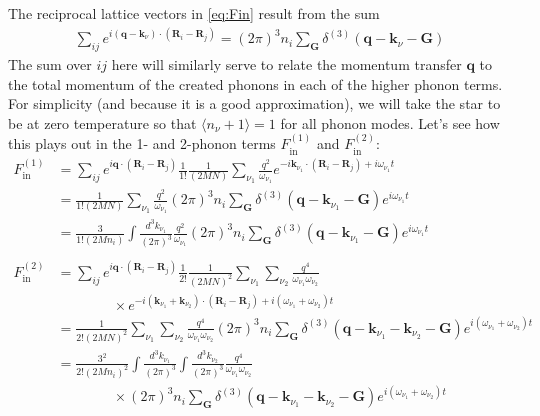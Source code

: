 \documentclass{article}
\begin{document}
The reciprocal lattice vectors in \eqref{eq:Fin} result from the sum
\begin{align}
\sum_{ij} e^{i(\textbf{q} - \textbf{k}_\nu)\cdot(\textbf{R}_i - \textbf{R}_j)} = (2 \pi)^3 n_i\sum_\textbf{G} \delta^{(3)} (\textbf{q} - \textbf{k}_\nu - \textbf{G})
\end{align}
The sum over $ij$ here will similarly serve to relate the momentum transfer $\textbf{q}$ to the total momentum of the created phonons in each of the higher phonon terms. For simplicity (and because it is a good approximation), we will take the star to be at zero temperature so that $\langle n_\nu + 1 \rangle = 1$ for all phonon modes. Let's see how this plays out in the 1- and 2-phonon terms $F_\text{in}^{(1)}$ and $F_\text{in}^{(2)}$:
\begin{align}
F_\text{in}^{(1)} &= \sum_{ij} e^{i\textbf{q}\cdot(\textbf{R}_i - \textbf{R}_j)} \frac{1}{1!} \frac{1}{(2 MN)} \sum_{\nu_1} \frac{q^2}{\omega_{\nu_1}} e^{-i \textbf{k}_{\nu_1} \cdot(\textbf{R}_i - \textbf{R}_j) + i \omega_{\nu_1} t} \nonumber\\
    &= \frac{1}{1!(2 MN)} \sum_{\nu_1} \frac{q^2}{\omega_{\nu_1}} (2 \pi)^3 n_i \sum_\textbf{G} \delta^{(3)}(\textbf{q} - \textbf{k}_{\nu_1} - \textbf{G}) e^{i \omega_{\nu_1} t} \nonumber\\
    &= \frac{3}{1!(2 M n_i)} \int\frac{d^3 k_{\nu_1}}{(2 \pi)^3} \frac{q^2}{\omega_{\nu_1}} (2 \pi)^3 n_i \sum_\textbf{G} \delta^{(3)}(\textbf{q} - \textbf{k}_{\nu_1} - \textbf{G}) e^{i \omega_{\nu_1} t} \\
  \nonumber\\
F_\text{in}^{(2)} &= \sum_{ij} e^{i\textbf{q}\cdot(\textbf{R}_i - \textbf{R}_j)} \frac{1}{2!} \frac{1}{(2 MN)^2} \sum_{\nu_1} \sum_{\nu_2} \frac{q^4}{\omega_{\nu_1}\omega_{\nu_2}} \nonumber\\
&\qquad\qquad \times e^{-i (\textbf{k}_{\nu_1} + \textbf{k}_{\nu_2}) \cdot(\textbf{R}_i - \textbf{R}_j) + i (\omega_{\nu_1} + \omega_{\nu_2}) t} \nonumber\\
   &= \frac{1}{2!(2 MN)^2} \sum_{\nu_1} \sum_{\nu_2} \frac{q^4}{\omega_{\nu_1}\omega_{\nu_2}} (2 \pi)^3 n_i\sum_\textbf{G} \delta^{(3)}(\textbf{q} - \textbf{k}_{\nu_1} - \textbf{k}_{\nu_2} - \textbf{G}) e^{i(\omega_{\nu_1} + \omega_{\nu_2})t} \nonumber\\
   &= \frac{3^2}{2!(2 Mn_i)^2} \int\frac{d^3 k_{\nu_1}}{(2 \pi)^3} \int\frac{d^3 k_{\nu_2}}{(2 \pi)^3}  \frac{q^4}{\omega_{\nu_1}\omega_{\nu_2}}  \nonumber\\
   & \qquad\qquad \times (2 \pi)^3 n_i\sum_\textbf{G} \delta^{(3)}(\textbf{q} - \textbf{k}_{\nu_1} - \textbf{k}_{\nu_2} - \textbf{G}) e^{i(\omega_{\nu_1} + \omega_{\nu_2})t}
\end{align}
\end{document}

